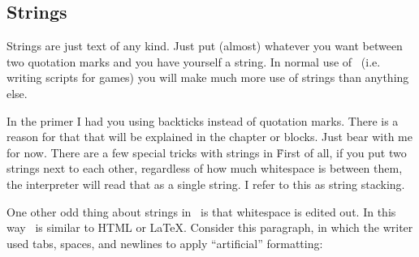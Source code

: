 \subsection{Strings}
Strings are just text of any kind.  Just put (almost) whatever you want between two quotation marks and you have yourself a string.   In normal use of \SSquared\ (i.e. writing scripts for games) you will make much more use of strings than anything else.

\begin{SSCodeBox}
\end{SSCodeBox}

In the primer I had you using backticks instead of quotation marks.  There is a reason for that that will be explained in the chapter or blocks.  Just bear with me for now.  There are a few special tricks with strings in \SSquared\.  First of all, if you put two strings next to each other, regardless of how much whitespace is between them, the interpreter will read that as a single string.  I refer to this as string stacking.

\begin{SSCodeBox}
\end{SSCodeBox}

One other odd thing about strings in \SSquared\ is that whitespace is edited out.  In this way \SSquared\ is similar to HTML or \LaTeX{}.  Consider this paragraph, in which the writer used tabs, spaces, and newlines to apply ``artificial'' formatting:

\begin{SSCodeBox}
\scitea{ }
 \\
 \\
 \\
\scitea{;}
\end{SSCodeBox}

